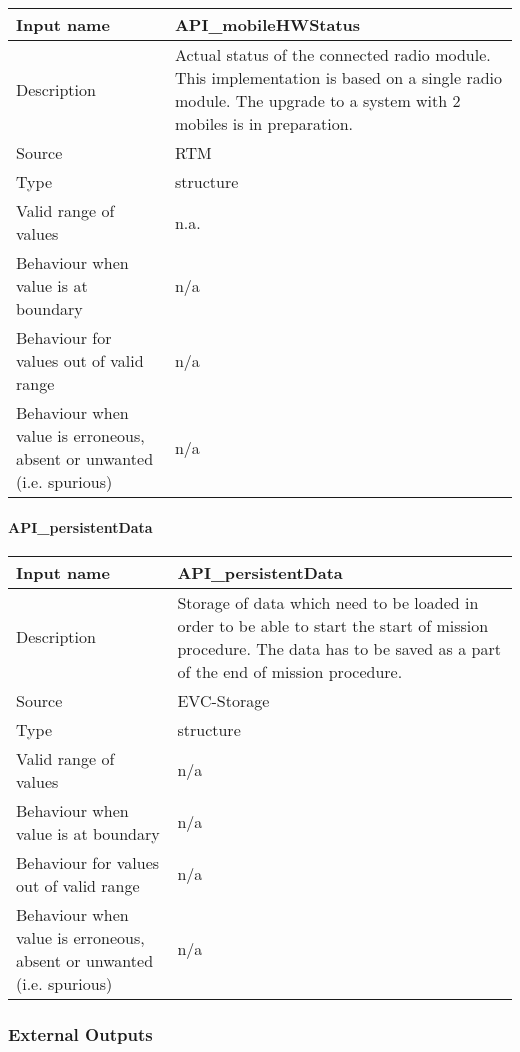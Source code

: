 \begin{longtable}{p{}p{}}
\toprule
Input name				& API\_mobileHWStatus \\
\midrule
Description				& Actual status of the connected radio module. This implementation is based on a single radio module. The upgrade to a system with 2 mobiles is in preparation.\\
\midrule
Source					& RTM \\ 
\midrule
Type					& structure \\
\midrule
Valid range of values	& n.a. \\
\midrule
Behaviour when value is at boundary	& n/a \\
\midrule
Behaviour for values out of valid range	& n/a \\
\midrule
Behaviour when value is erroneous, absent or unwanted (i.e. spurious) & n/a \\
\bottomrule
\end{longtable}

\paragraph{API\_persistentData}

\begin{longtable}{p{}p{}}
\toprule
Input name				& API\_persistentData \\
\midrule
Description				& Storage of data which need to be loaded in order to be able to start the start of mission procedure. The data has to be saved as a part of the end of mission procedure. \\
\midrule
Source					& EVC-Storage \\ 
\midrule
Type					& structure \\
\midrule
Valid range of values	& n/a \\
\midrule
Behaviour when value is at boundary	& n/a \\
\midrule
Behaviour for values out of valid range	& n/a \\
\midrule
Behaviour when value is erroneous, absent or unwanted (i.e. spurious) &n/a \\
\bottomrule
\end{longtable}



\subsubsection{External Outputs}

